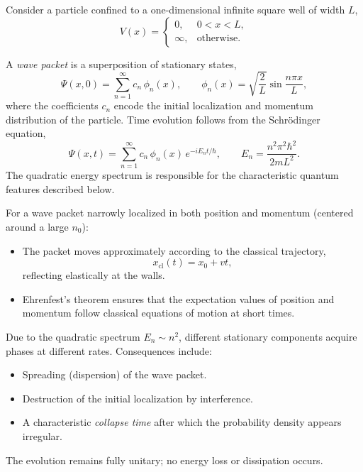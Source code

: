 Consider a particle confined to a one-dimensional infinite square well of width $L$,
\begin{equation}
V(x) = 
\begin{cases}
0, & 0 < x < L,\\
\infty, & \text{otherwise}.
\end{cases}
\end{equation}

A \emph{wave packet} is a superposition of stationary states,
\begin{equation}
\Psi(x,0) = \sum_{n=1}^{\infty} c_n \, \phi_n(x), 
\qquad
\phi_n(x) = \sqrt{\frac{2}{L}} \sin \frac{n \pi x}{L},
\end{equation}
where the coefficients $c_n$ encode the initial localization and momentum distribution of the particle.  
Time evolution follows from the Schr\"odinger equation,
\begin{equation}
\Psi(x,t) = \sum_{n=1}^{\infty} c_n \, \phi_n(x) \, e^{-i E_n t/\hbar}, 
\qquad
E_n = \frac{n^2 \pi^2 \hbar^2}{2 m L^2}.
\end{equation}
The quadratic energy spectrum is responsible for the characteristic quantum features described below.

For a wave packet narrowly localized in both position and momentum (centered around a large $n_0$):
\begin{itemize}
    \item The packet moves approximately according to the classical trajectory,
    \begin{equation}
    x_{\mathrm{cl}}(t) = x_0 + v t,
    \end{equation}
    reflecting elastically at the walls.
    \item Ehrenfest's theorem ensures that the expectation values of position and momentum follow classical equations of motion at short times.
\end{itemize}

Due to the quadratic spectrum $E_n \sim n^2$, different stationary components acquire phases at different rates.  
Consequences include:
\begin{itemize}
    \item Spreading (dispersion) of the wave packet.
    \item Destruction of the initial localization by interference.
    \item A characteristic \emph{collapse time} after which the probability density appears irregular.
\end{itemize}
The evolution remains fully unitary; no energy loss or dissipation occurs.

